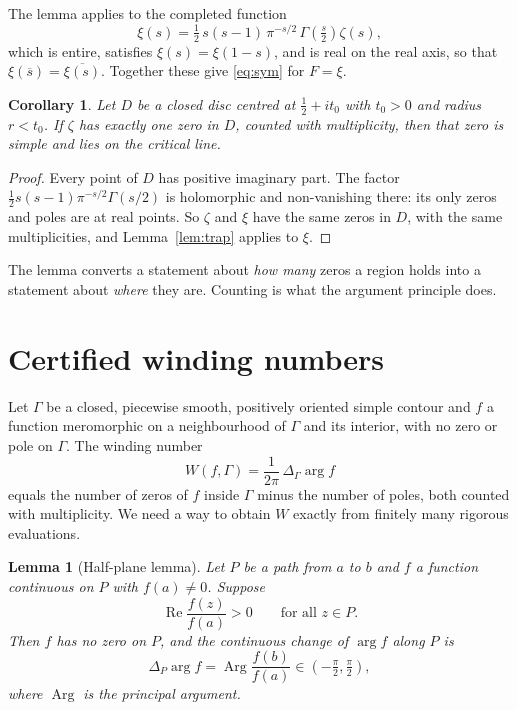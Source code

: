 \documentclass[11pt,a4paper]{article}
\newtheorem{lemma}[theorem]{Lemma}
\newtheorem{corollary}[theorem]{Corollary}
\theoremstyle{definition}
\newcommand{\conj}[1]{\overline{#1}}
\DeclareMathOperator{\re}{Re}
\DeclareMathOperator{\Arg}{Arg}
\begin{document}
The lemma applies to the completed function
\[
  \xi(s)=\tfrac12\,s(s-1)\,\pi^{-s/2}\,\Gamma\!\left(\tfrac{s}{2}\right)\zeta(s),
\]
which is entire, satisfies $\xi(s)=\xi(1-s)$, and is real on the real axis, so
that $\xi(\conj{s})=\conj{\xi(s)}$. Together these give \eqref{eq:sym} for
$F=\xi$.

\begin{corollary}\label{cor:zeta}
Let $D$ be a closed disc centred at $\tfrac12+it_0$ with $t_0>0$ and radius
$r<t_0$. If $\zeta$ has exactly one zero in $D$, counted with multiplicity,
then that zero is simple and lies on the critical line.
\end{corollary}

\begin{proof}
Every point of $D$ has positive imaginary part. The factor
$\tfrac12 s(s-1)\pi^{-s/2}\Gamma(s/2)$ is holomorphic and non-vanishing there:
its only zeros and poles are at real points. So $\zeta$ and $\xi$ have the
same zeros in $D$, with the same multiplicities, and Lemma~\ref{lem:trap}
applies to $\xi$.
\end{proof}

The lemma converts a statement about \emph{how many} zeros a region holds
into a statement about \emph{where} they are. Counting is what the argument
principle does.

\section{Certified winding numbers}\label{sec:winding}

Let $\Gamma$ be a closed, piecewise smooth, positively oriented simple contour
and $f$ a function meromorphic on a neighbourhood of $\Gamma$ and its
interior, with no zero or pole on $\Gamma$. The winding number
\[
  W(f,\Gamma)=\frac{1}{2\pi}\,\Delta_\Gamma \arg f
\]
equals the number of zeros of $f$ inside $\Gamma$ minus the number of poles,
both counted with multiplicity. We need a way to obtain $W$ exactly from
finitely many rigorous evaluations.

\begin{lemma}[Half-plane lemma]\label{lem:half}
Let $P$ be a path from $a$ to $b$ and $f$ a function continuous on $P$ with
$f(a)\neq0$. Suppose
\begin{equation}\label{eq:half}
  \re\frac{f(z)}{f(a)}>0\qquad\text{for all } z\in P .
\end{equation}
Then $f$ has no zero on $P$, and the continuous change of $\arg f$ along $P$
is
\[
  \Delta_P\arg f=\Arg\frac{f(b)}{f(a)}\in\left(-\tfrac{\pi}{2},\tfrac{\pi}{2}\right),
\]
where $\Arg$ is the principal argument.
\end{lemma}
\end{document}
